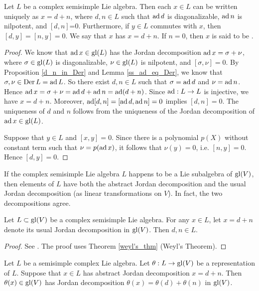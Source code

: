 \begin{thm}
    Let $L$ be a complex semisimple Lie algebra. Then each $x\in L$ can be written uniquely as $x=d+n$, where $d,n\in L$ such that $\operatorname{ad} d$ is diagonalizable, $\operatorname{ad} n$ is nilpotent, and $[d,n]$=0. Furthermore, if $y\in L$ commutes with $x$, then $[d,y]=[n,y]=0$. We say that $x$ has  $x=d+n$. If $n=0$, then $x$ is said to be .
\end{thm}

\begin{proof}
    We know that $\operatorname{ad} x\in\mathrm{gl}(L)$ has the Jordan decomposition $\operatorname{ad} x=\sigma+\nu$, where $\sigma\in\mathrm{gl}(L)$ is diagonalizable, $\nu\in\mathrm{gl}(L)$ is nilpotent, and $[\sigma,\nu]=0$. By Proposition \ref{d_n_in_Der} and Lemma \ref{ss_ad_eq_Der}, we know that $\sigma,\nu\in \operatorname{Der} L=\operatorname{ad} L$. So there exist $d,n\in L$ such that $\sigma=\operatorname{ad} d$ and $\nu=\operatorname{ad} n$. Hence $\operatorname{ad} x=\sigma+\nu=\operatorname{ad} d+\operatorname{ad} n=\operatorname{ad} (d+n)$. Since $\operatorname{ad} :L\to L$ is injective, we have $x=d+n$. Moreover, $\operatorname{ad}[d,n]=[\operatorname{ad} d,\operatorname{ad} n]=0$ implies $[d,n]=0$. The uniqueness of $d$ and $n$ follows from the uniqueness of the Jordan decomposition of $\operatorname{ad} x\in\mathrm{gl}(L)$.

    Suppose that $y\in L$ and $[x,y]=0$. Since there is a polynomial $p(X)$ without constant term such that $\nu=p(\operatorname{ad} x)$, it follows that $\nu(y)=0$, i.e. $[n,y]=0$. Hence $[d,y]=0$.
\end{proof}

If the complex semisimple Lie algebra $L$ happens to be a Lie subalgebra of $\mathrm{gl}(V)$, then elements of $L$ have both the abstract Jordan decomposition and the usual Jordan decomposition (as linear transformations on $V$). In fact, the two decompositions agree.

\begin{lem}\label{d_n_in_L}
    Let $L\subset \mathrm{gl}(V)$ be a complex semisimple Lie algebra. For any $x\in L$, let $x=d+n$ denote its usual Jordan decomposition in $\mathrm{gl}(V)$. Then $d,n\in L$.
\end{lem}

\begin{proof}
    See \cite[p. 29]{Humphreys_Lie_alg}. The proof uses Theorem \ref{weyl's_thm} (Weyl's Theorem).
\end{proof}

\begin{thm}
    Let $L$ be a semisimple complex Lie algebra. Let $\theta:L\to \mathrm{gl}(V)$ be a representation of $L$. Suppose that $x\in L$ has abstract Jordan decomposition $x=d+n$. Then $\theta(x)\in\mathrm{gl}(V)$ has Jordan decomposition $\theta(x)=\theta(d)+\theta(n)$ in $\mathrm{gl}(V)$. 
\end{thm}

